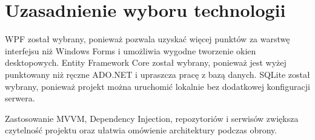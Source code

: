 \section{Uzasadnienie wyboru technologii}

WPF został wybrany, ponieważ pozwala uzyskać więcej punktów za warstwę interfejsu niż Windows Forms i umożliwia wygodne tworzenie okien desktopowych. Entity Framework Core został wybrany, ponieważ jest wyżej punktowany niż ręczne ADO.NET i upraszcza pracę z bazą danych. SQLite został wybrany, ponieważ projekt można uruchomić lokalnie bez dodatkowej konfiguracji serwera.

Zastosowanie MVVM, Dependency Injection, repozytoriów i serwisów zwiększa czytelność projektu oraz ułatwia omówienie architektury podczas obrony.
